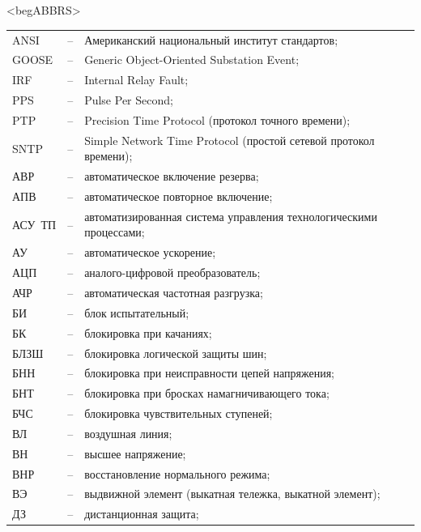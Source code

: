 \color{unimain}\section*{}
{\color{white}\fontsize{0.1pt}{0.1pt}\selectfont<begABBRS>}
\color{black}
\begin{longtable}{>{\raggedright\arraybackslash}m{2cm}>{\raggedright\arraybackslash}m{0.5cm}>{\raggedright\arraybackslash}m{20cm}}
\endfirsthead\endhead\endfoot\endlastfoot
ANSI & -- & Американский национальный институт стандартов; \\
GOOSE & -- & Generic Object-Oriented Substation Event; \\
IRF & -- & Internal Relay Fault; \\
PPS & -- & Pulse Per Second; \\
PTP & -- & Precision Time Protocol (протокол точного времени); \\
SNTP & -- & Simple Network Time Protocol (простой сетевой протокол времени); \\
АВР & -- & автоматическое включение резерва; \\
АПВ & -- & автоматическое повторное включение; \\
АСУ~ТП & -- & автоматизированная система управления технологическими процессами; \\
АУ & -- & автоматическое ускорение; \\
АЦП & -- & аналого-цифровой преобразователь; \\
АЧР & -- & автоматическая частотная разгрузка; \\
БИ & -- & блок испытательный; \\
БК & -- & блокировка при качаниях; \\
БЛЗШ & -- & блокировка логической защиты шин; \\
БНН & -- & блокировка при неисправности цепей напряжения; \\
БНТ & -- & блокировка при бросках намагничивающего тока; \\
БЧС & -- & блокировка чувствительных ступеней; \\
ВЛ & -- & воздушная линия; \\
ВН & -- & высшее напряжение; \\
ВНР & -- & восстановление нормального режима; \\
ВЭ & -- & выдвижной элемент (выкатная тележка, выкатной элемент); \\
ДЗ & -- & дистанционная защита; \\

\end{longtable}
